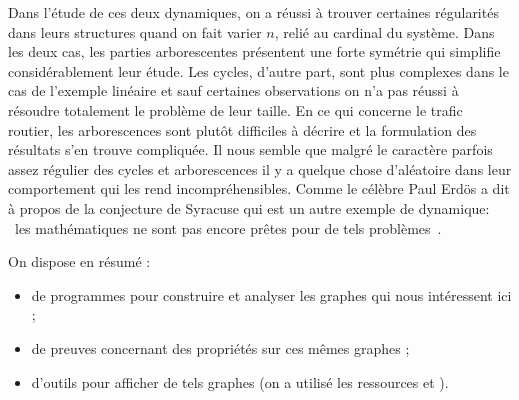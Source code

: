 \conclusion

Dans l’\'etude de ces deux dynamiques, on a r\'eussi \`a trouver certaines r\'egularit\'es dans leurs structures quand on fait varier $n$, reli\'e au cardinal du système. Dans les deux cas, les parties arborescentes pr\'esentent une forte sym\'etrie qui simplifie consid\'erablement leur \'etude. Les cycles, d’autre part, sont plus complexes dans le cas de l'exemple lin\'eaire et sauf certaines observations on n’a pas r\'eussi \`a r\'esoudre totalement le problème de leur taille. En ce qui concerne le trafic routier, les arborescences sont plut\^ot difficiles \`a d\'ecrire et la formulation des r\'esultats s'en trouve compliqu\'ee. Il nous semble que malgr\'e le caractère parfois assez r\'egulier des cycles et arborescences il y a quelque chose d’al\'eatoire dans leur comportement qui les rend incompr\'ehensibles. Comme le c\'elèbre Paul Erd\"os a dit \`a propos de la conjecture de Syracuse qui est un autre exemple de dynamique: \og{}~les math\'ematiques ne sont pas encore prêtes pour de tels problèmes~\fg{}.

On dispose en r\'esum\'e :
\begin{itemize}
\item de programmes pour construire et analyser les graphes qui nous int\'eressent ici ;
\item de preuves concernant des propri\'et\'es sur ces m\^emes graphes ;
\item d'outils pour afficher de tels graphes (on a utilis\'e les ressources \cite{GV} et \cite{NX}).
\end{itemize}